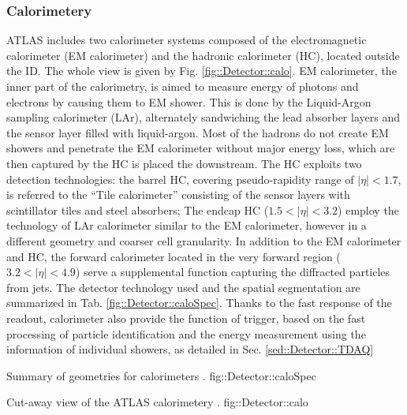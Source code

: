 \subsubsection{Calorimetery}
ATLAS includes two calorimeter systems composed of the electromagnetic calorimeter (EM calorimeter) and the hadronic calorimeter (HC), located outside the ID. 
The whole view is given by Fig. \ref{fig::Detector::calo}.
EM calorimeter, the inner part of the calorimetry, is aimed to measure energy of photons and electrons by causing them to EM shower. 
This is done by the Liquid-Argon sampling calorimeter (LAr), alternately sandwiching the lead absorber layers and the sensor layer filled with liquid-argon.
Most of the hadrons do not create EM showers and penetrate the EM calorimeter without major energy loss, which are then captured by the HC is placed the downstream. The HC exploits two detection technologies: the barrel HC, covering pseudo-rapidity range of $|\eta|<1.7$, is referred to the ``Tile calorimeter'' consisting of the sensor layers with scintillator tiles and steel absorbers; The endcap HC ($1.5<|\eta|<3.2$) employ the technology of LAr calorimeter similar to the EM calorimeter, however in a different geometry and coarser cell granularity. In addition to the EM calorimeter and HC, the forward calorimeter located in the very forward region ($3.2<|\eta|<4.9$) serve a supplemental function capturing the diffracted particles from jets. The detector technology used and the spatial segmentation are summarized in Tab. \ref{fig::Detector::caloSpec}.
Thanks to the fast response of the readout, calorimeter also provide the function of trigger, based on the fast processing of particle identification and the energy measurement using the information of individual showers, as detailed in Sec. \ref{sed::Detector::TDAQ}

\clearpage
{}
{Summary of geometries for calorimeters \cite{ATLAS_TDR}.}
{fig::Detector::caloSpec}
\clearpage


{Cut-away view of the ATLAS calorimetery \cite{ATLAS_exp}.}
{fig::Detector::calo}



